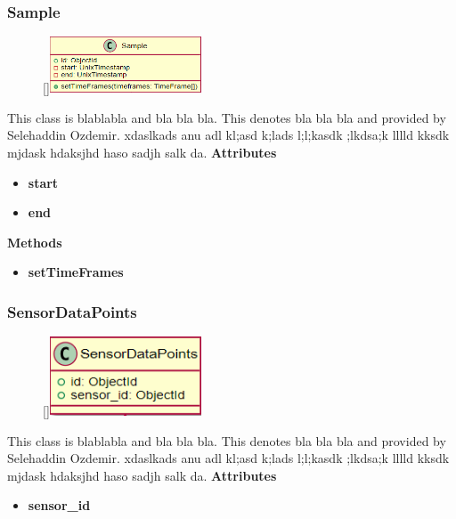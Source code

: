 \subsubsection{Sample}
\begin{figure}
    \raisebox{0pt}[\dimexpr{}\baselineskip\relax]{\includegraphics[width=4.5cm]{classes/workspace-management/7.png}}
\end{figure} 
\par
This class is blablabla and bla bla bla. This denotes bla bla bla and provided by Selehaddin Ozdemir. xdaslkads anu adl kl;asd k;lads l;l;kasdk ;lkdsa;k lllld kksdk mjdask hdaksjhd haso sadjh salk da.
\newline
\newline
\textbf{Attributes}
\begin{itemize}
    \item \textbf{start}
    \item \textbf{end}
\end{itemize}
\textbf{Methods}
\begin{itemize}
    \item \textbf{setTimeFrames}
\end{itemize}

\subsubsection{SensorDataPoints}
\begin{figure}
    \raisebox{0pt}[\dimexpr{}\baselineskip\relax]{\includegraphics[width=4.5cm]{classes/workspace-management/8.png}}
\end{figure} 
\par
This class is blablabla and bla bla bla. This denotes bla bla bla and provided by Selehaddin Ozdemir. xdaslkads anu adl kl;asd k;lads l;l;kasdk ;lkdsa;k lllld kksdk mjdask hdaksjhd haso sadjh salk da.
\newline
\newline
\textbf{Attributes}
\begin{itemize}
    \item \textbf{sensor\_id}
\end{itemize}

